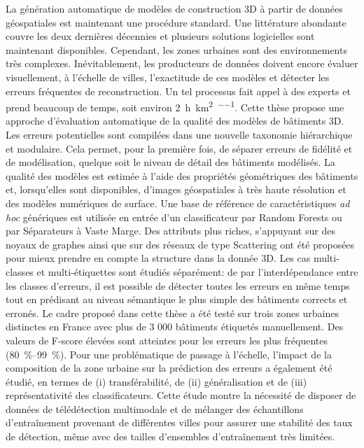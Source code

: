 La génération automatique de modèles de construction 3D à partir de données géospatiales est maintenant une procédure standard.
Une littérature abondante couvre les deux dernières décennies et plusieurs solutions logicielles sont maintenant disponibles.
Cependant, les zones urbaines sont des environnements très complexes.
Inévitablement, les producteurs de données doivent encore évaluer visuellement, à l'échelle de villes, l'exactitude de ces modèles et détecter les erreurs fréquentes de reconstruction.
Un tel processus fait appel à des experts et prend beaucoup de temps, soit environ \SI[per-mode=repeated-symbol]{2}{\hour\per\km\squared\per\expert}.
Cette thèse propose une approche d'évaluation automatique de la qualité des modèles de bâtiments 3D.
Les erreurs potentielles sont compilées dans une nouvelle taxonomie hiérarchique et modulaire.
Cela permet, pour la première fois, de séparer erreurs de fidélité et de modélisation, quelque soit le niveau de détail des bâtiments modélisés.
La qualité des modèles est estimée à l'aide des propriétés géométriques des bâtiments et, lorsqu'elles sont disponibles, d'images géospatiales à très haute résolution et des modèles numériques de surface.
Une base de référence de caractéristiques \textit{ad hoc} génériques est utilisée en entrée d'un classificateur par Random Forests ou par Séparateurs à Vaste Marge.
Des attributs plus riches, s'appuyant sur des noyaux de graphes ainsi que sur des réseaux de type Scattering ont été proposées pour mieux prendre en compte la structure dans la donnée 3D.
Les cas multi-classes et multi-étiquettes sont étudiés séparément: de par l'interdépendance entre les classes d'erreurs, il est possible de détecter toutes les erreurs en même temps tout en prédisant au niveau sémantique le plus simple des bâtiments corrects et erronés.
Le cadre proposé dans cette thèse a été testé sur trois zones urbaines distinctes en France avec plus de 3 000 bâtiments étiquetés manuellement.
Des valeurs de F-score élevées sont atteintes pour les erreurs les plus fréquentes (\SIrange[range-phrase={ -- }]{80}{99}{\percent}).
Pour une problématique de passage à l’échelle, l'impact de la composition de la zone urbaine sur la prédiction des erreurs a également été étudié, en termes de (i) transférabilité, de (ii) généralisation et de (iii) représentativité des classificateurs.
Cette étude montre la nécessité de disposer de données de télédétection multimodale et de mélanger des échantillons d'entraînement provenant de différentes villes pour assurer une stabilité des taux de détection, même avec des tailles d'ensembles d'entraînement très limitées.
